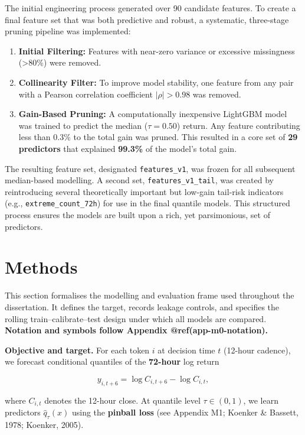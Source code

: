 \documentclass[
  a4paper,
  DIV=11,
  numbers=noendperiod]{scrreprt}
\providecommand{\tightlist}{%
  \setlength{\itemsep}{0pt}\setlength{\parskip}{0pt}}
\begin{document}
The initial engineering process generated over 90 candidate features. To
create a final feature set that was both predictive and robust, a
systematic, three-stage pruning pipeline was implemented:

\begin{enumerate}
\def\labelenumi{\arabic{enumi}.}
\tightlist
\item
  \textbf{Initial Filtering:} Features with near-zero variance or
  excessive missingness (\textgreater80\%) were removed.
\item
  \textbf{Collinearity Filter:} To improve model stability, one feature
  from any pair with a Pearson correlation coefficient \(|\rho| > 0.98\)
  was removed.
\item
  \textbf{Gain-Based Pruning:} A computationally inexpensive LightGBM
  model was trained to predict the median (\(\tau=0.50\)) return. Any
  feature contributing less than 0.3\% to the total gain was pruned.
  This resulted in a core set of \textbf{29 predictors} that explained
  \textbf{99.3\%} of the model's total gain.
\end{enumerate}

The resulting feature set, designated \texttt{features\_v1}, was frozen
for all subsequent median-based modelling. A second set,
\texttt{features\_v1\_tail}, was created by reintroducing several
theoretically important but low-gain tail-risk indicators (e.g.,
\texttt{extreme\_count\_72h}) for use in the final quantile models. This
structured process ensures the models are built upon a rich, yet
parsimonious, set of predictors.


\chapter{Methods}\label{methods}

This section formalises the modelling and evaluation frame used
throughout the dissertation. It defines the target, records leakage
controls, and specifies the rolling train--calibrate--test design under
which all models are compared. \textbf{Notation and symbols follow
Appendix @ref(app-m0-notation).}

\textbf{Objective and target.} For each token \(i\) at decision time
\(t\) (12-hour cadence), we forecast conditional quantiles of the
\textbf{72-hour} log return

\[
y_{i,t+6}=\log C_{i,t+6}-\log C_{i,t},
\]

where \(C_{i,t}\) denotes the 12-hour close. At quantile level
\(\tau\in(0,1)\), we learn predictors \(\widehat q_\tau(x)\) using the
\textbf{pinball loss} (see Appendix M1; Koenker \& Bassett, 1978;
Koenker, 2005).
\end{document}
